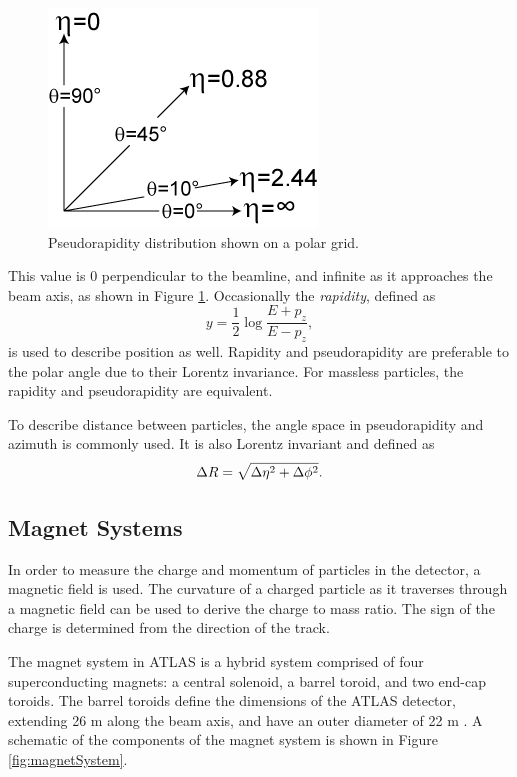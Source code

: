 \begin{figure}[!ht]
    \centering
    \includegraphics[width=.43\textwidth]{chapters/chapter2_experiment/images/Pseudorapidity2.png}
    \caption[Pseudorapidity distribution shown on a polar grid]{Pseudorapidity distribution shown on a polar grid.}
    \label{fig:pseudorapidity}
\end{figure}

This value is 0 perpendicular to the beamline, and infinite as it approaches the beam axis, as shown in Figure \ref{fig:pseudorapidity}. Occasionally the \textit{rapidity}, defined as
%
\begin{equation}
    y = \frac{1}{2} \log{\frac{E+p_z}{E-p_z}},
\end{equation}
%
is used to describe position as well. Rapidity and pseudorapidity are preferable to the polar angle due to their Lorentz invariance. For massless particles, the rapidity and pseudorapidity are equivalent.

To describe distance between particles, the angle space in pseudorapidity and azimuth is commonly used. It is also Lorentz invariant and defined as
\begin{equation}
    \Delta R = \sqrt{\Delta\eta^2 + \Delta \phi^2}.
\end{equation}
%

\subsection{Magnet Systems} \label{ssec:magnetsystem}
In order to measure the charge and momentum of particles in the detector, a magnetic field is used. The curvature of a charged particle as it traverses through a magnetic field can be used to derive the charge to mass ratio. The sign of the charge is determined from the direction of the track.

The magnet system in ATLAS is a hybrid system comprised of four superconducting magnets: a central solenoid, a barrel toroid, and two end-cap toroids. The barrel toroids define the dimensions of the ATLAS detector, extending 26 m along the beam axis, and have an outer diameter of 22 m \cite{magnet-system-tdr}. A schematic of the components of the magnet system is shown in Figure \ref{fig:magnetSystem}.

